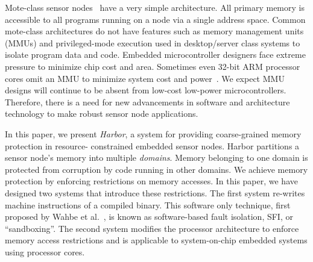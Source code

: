 Mote-class sensor nodes~\cite{jasonhillthesis} have a very simple architecture.
%
All primary memory is accessible to all programs running
on a node via a single address space.
%
Common mote-class architectures do not have features such as memory
management units (MMUs) and privileged-mode execution used in
desktop/server class systems to isolate program data and code.
%
Embedded microcontroller designers face extreme pressure to minimize chip cost and area.
%
Sometimes even 32-bit ARM processor cores omit an MMU to minimize system cost and power~\cite{arm7tdmi}.
%
We expect MMU designs will continue to be absent from low-cost low-power
microcontrollers.
%
Therefore, there is a need for new advancements in software and architecture
technology to make robust sensor node applications.
%
%
%
%
%
%
%
%
%


In this paper, we present \emph{Harbor}, a system for providing
coarse-grained memory protection in resource-%
constrained embedded sensor nodes.
%
%
%
Harbor partitions a sensor node's memory into
multiple \textit{domains}.
%
Memory belonging to one domain is protected from corruption by code running
in other domains.
%
We achieve memory protection by enforcing restrictions on memory accesses.
%
In this paper, we have designed two systems that introduce these restrictions.
%
The first system re-writes machine instructions of a compiled binary.
%
This software only technique, first proposed by Wahbe et
al.~\cite{wahbe93sfi}, is known as software-based fault isolation,
SFI, or ``sandboxing''.
%
The second system modifies the processor architecture to enforce memory
access restrictions and is applicable to system-on-chip embedded
systems using processor cores.
%


